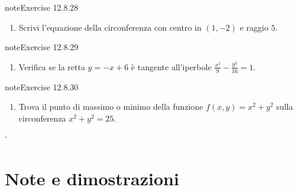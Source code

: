 \documentclass[letterpaper,10pt,italian]{jupyterBook}
\begin{document}
\begin{sphinxadmonition}{note}{Exercise 12.8.28}


\begin{enumerate}
%
\setcounter{enumi}{27}
\item {} 
\sphinxAtStartPar
Scrivi l’equazione della circonferenza con centro in \( (1, -2) \) e raggio \( 5 \).

\end{enumerate}
\end{sphinxadmonition}
 \label{exercise:ch/analytic_geometry/analytic_geometry_2d/sol-exercise-28}

\begin{sphinxadmonition}{note}{Exercise 12.8.29}


\begin{enumerate}
%
\setcounter{enumi}{28}
\item {} 
\sphinxAtStartPar
Verifica se la retta \( y = -x + 6 \) è tangente all’iperbole \( \frac{x^2}{9} - \frac{y^2}{16} = 1 \).

\end{enumerate}
\end{sphinxadmonition}
 \label{exercise:ch/analytic_geometry/analytic_geometry_2d/sol-exercise-29}

\begin{sphinxadmonition}{note}{Exercise 12.8.30}


\begin{enumerate}
%
\setcounter{enumi}{29}
\item {} 
\sphinxAtStartPar
Trova il punto di massimo o minimo della funzione \( f(x, y) = x^2 + y^2 \) sulla circonferenza \( x^2 + y^2 = 25 \).

\end{enumerate}
\end{sphinxadmonition}

\sphinxAtStartPar
`

\sphinxstepscope


\section{Note e dimostrazioni}
\label{\detokenize{ch/analytic_geometry/analytic_geometry_2d/notes:note-e-dimostrazioni}}\label{\detokenize{ch/analytic_geometry/analytic_geometry_2d/notes:geometry-analytic-2d-notes}}\label{\detokenize{ch/analytic_geometry/analytic_geometry_2d/notes::doc}}
\end{document}
